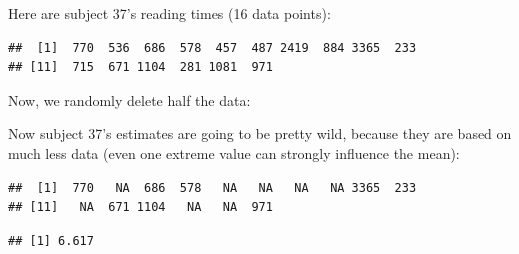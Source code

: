 \documentclass[12pt,]{krantz}
\newenvironment{Shaded}{\begin{snugshade}}{\end{snugshade}}
\newcommand{\DecValTok}[1]{\textcolor[rgb]{0.00,0.00,0.81}{#1}}
\newcommand{\KeywordTok}[1]{\textcolor[rgb]{0.13,0.29,0.53}{\textbf{#1}}}
\newcommand{\NormalTok}[1]{#1}
\newcommand{\OperatorTok}[1]{\textcolor[rgb]{0.81,0.36,0.00}{\textbf{#1}}}
\newcommand{\OtherTok}[1]{\textcolor[rgb]{0.56,0.35,0.01}{#1}}
\newcommand{\StringTok}[1]{\textcolor[rgb]{0.31,0.60,0.02}{#1}}
\begin{document}
Here are subject 37's reading times (16 data points):

\begin{Shaded}
\end{Shaded}

\begin{verbatim}
##  [1]  770  536  686  578  457  487 2419  884 3365  233
## [11]  715  671 1104  281 1081  971
\end{verbatim}

Now, we randomly delete half the data:

\begin{Shaded}
\end{Shaded}

Now subject 37's estimates are going to be pretty wild, because they are based on much less data (even one extreme value can strongly influence the mean):

\begin{Shaded}
\end{Shaded}

\begin{verbatim}
##  [1]  770   NA  686  578   NA   NA   NA   NA 3365  233
## [11]   NA  671 1104   NA   NA  971
\end{verbatim}

\begin{verbatim}
## [1] 6.617
\end{verbatim}
\end{document}
